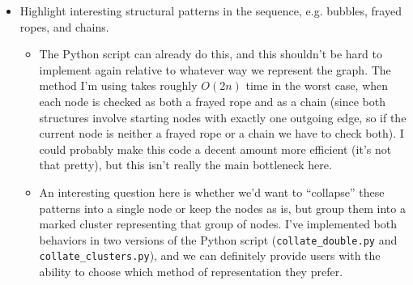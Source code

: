 \documentclass[12pt]{article}
\begin{document}
\begin{itemize}
	\begin{itemize}
	\item Highlight interesting structural patterns in the sequence,
		e.g. bubbles, frayed ropes, and chains.
		\begin{itemize}
		\item The Python script can already do this, and this
			shouldn't be hard to implement again relative to
			whatever way we represent the graph. The method I'm
			using takes roughly $O(2n)$ time in the worst case,
			when each node is checked as both a frayed rope and
			as a chain (since both structures involve starting
			nodes with exactly one outgoing edge, so if the
			current node is neither a frayed rope or a chain
			we have to check both). I could probably make this
			code a decent amount more efficient (it's not that
			pretty), but this isn't really the main bottleneck
			here.
		\item An interesting question here is whether we'd want to
			``collapse'' these patterns into a single node or
			keep the nodes as is, but group them into a marked
			cluster representing that group of nodes. I've
			implemented both behaviors in two versions of the
			Python script (\texttt{collate\_double.py} and
			\texttt{collate\_clusters.py}), and we can definitely
			provide users with the ability to choose which
			method of representation they prefer.
		\end{itemize}
	\end{itemize}			
	

\end{itemize}
\end{document}
